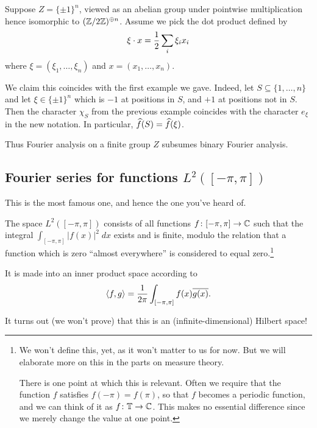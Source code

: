 \begin{example}
	Suppose $Z = \{\pm 1\}^n$, viewed as an abelian group
	under pointwise multiplication
	hence isomorphic to $(\mathbb Z/2\mathbb Z)^{\oplus n}$.
	Assume we pick the dot product defined by
	\[ \xi \cdot x = \frac{1}{2} \sum_i \xi_i x_i \]
	where $\xi = (\xi_1, \dots, \xi_n)$ and $x = (x_1, \dots, x_n)$.

	We claim this coincides with the first example we gave.
	Indeed, let $S \subseteq \{1, \dots, n\}$
	and let $\xi \in \{\pm1\}^n$ which is $-1$ at positions in $S$,
	and $+1$ at positions not in $S$.
	Then the character $\chi_S$ from the previous example
	coincides with the character $e_\xi$ in the new notation.
	In particular, $\widehat f(S) = \widehat f(\xi)$.

	Thus Fourier analysis on a finite group $Z$ subsumes
	binary Fourier analysis.
\end{example}

\subsection{Fourier series for functions $L^2([-\pi, \pi])$}
This is the most famous one, and hence the one you've heard of.
\begin{definition}
	The space $L^2([-\pi, \pi])$ consists of all functions
	$f \colon [-\pi, \pi] \to \mathbb C$ such that
	the integral
	$\int_{[-\pi, \pi]} \left\lvert f(x) \right\rvert^2 \; dx$
	exists and is finite,
	modulo the relation that a function which is zero ``almost everywhere''
	is considered to equal zero.\footnote{We won't define this, yet,
		as it won't matter to us for now.
		But we will elaborate more on this in the parts on measure theory.
	
		There is one point at which this is relevant.
		Often we require that the function $f$ satisfies $f(-\pi) = f(\pi)$,
		so that $f$ becomes a periodic function,
		and we can think of it as $f \colon \mathbb T \to \mathbb C$.
		This makes no essential difference
		since we merely change the value at one point.}

	It is made into an inner product space according to
	\[ \left< f,g \right>
		= \frac{1}{2\pi} \int_{[-\pi, \pi]} f(x) \overline{g(x)}. \]
\end{definition}
It turns out (we won't prove) that this is an
(infinite-dimensional) Hilbert space!

